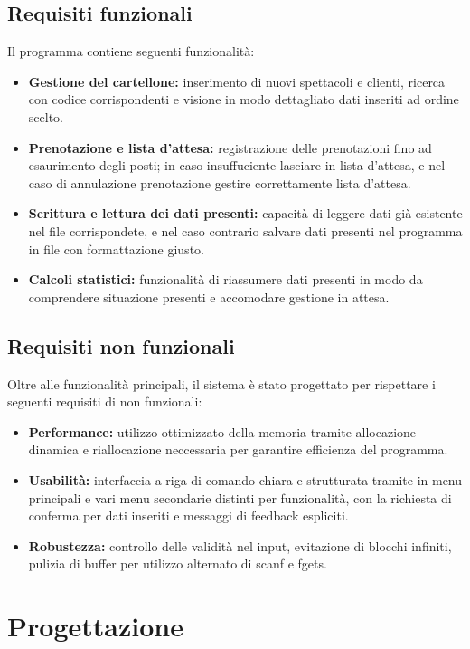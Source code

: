\documentclass[11pt,a4paper,oneside,openany]{book}
\begin{document}
\section{Requisiti funzionali}
Il programma contiene seguenti funzionalità:
\begin{itemize}

    \item \textbf{Gestione del cartellone:} inserimento di nuovi spettacoli e clienti, ricerca con codice corrispondenti e visione in modo dettagliato dati inseriti ad ordine scelto.
    \item \textbf{Prenotazione e lista d'attesa:} registrazione delle prenotazioni fino ad esaurimento degli posti; in caso insuffuciente lasciare in lista d'attesa, e nel caso di annulazione prenotazione gestire correttamente lista d'attesa.
    \item \textbf{Scrittura e lettura dei dati presenti:} capacità di leggere dati già esistente nel file corrispondete, e nel caso contrario salvare dati presenti nel programma in file con formattazione giusto.
    \item \textbf{Calcoli statistici:} funzionalità di riassumere dati presenti in modo da comprendere situazione presenti e accomodare gestione in attesa.
\end{itemize}

\section{Requisiti non funzionali}
Oltre alle funzionalità principali, il sistema è stato progettato per rispettare i seguenti requisiti di non funzionali:
\begin{itemize}
\item \textbf{Performance:} utilizzo ottimizzato della memoria tramite allocazione dinamica e riallocazione neccessaria per garantire efficienza del programma.
\item \textbf{Usabilità:} interfaccia a riga di comando chiara e strutturata tramite in menu principali e vari menu secondarie distinti per funzionalità, con la richiesta di conferma per dati inseriti e messaggi di feedback espliciti.
\item \textbf{Robustezza:} controllo delle validità nel input, evitazione di blocchi infiniti, pulizia di buffer per utilizzo alternato di scanf e fgets.
\end{itemize}

\chapter{Progettazione}
\end{document}
